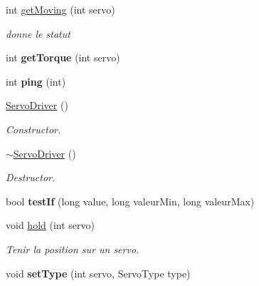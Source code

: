 \begin{DoxyCompactItemize}
int \hyperlink{classServoDriver_a0a8e84f0bbcff39549ddfc239f1a6237}{get\+Moving} (int servo)
\begin{DoxyCompactList}\small\item\em donne le statut \end{DoxyCompactList}\item 
\mbox{\label{classServoDriver_a108cce4f0dcf60bf443ee932621bc89c}} 
int {\bfseries get\+Torque} (int servo)
\item 
\mbox{\label{classServoDriver_afc853f7f2f46acb7e4721f4ce4314522}} 
int {\bfseries ping} (int)
\item 
\mbox{\label{classServoDriver_a2076bae148e26ee3f854f1f1984d9714}} 
\hyperlink{classServoDriver_a2076bae148e26ee3f854f1f1984d9714}{Servo\+Driver} ()
\begin{DoxyCompactList}\small\item\em Constructor. \end{DoxyCompactList}\item 
\mbox{\label{classServoDriver_acf6cad7d5b891fbe4ff44eaec8409db7}} 
\hyperlink{classServoDriver_acf6cad7d5b891fbe4ff44eaec8409db7}{$\sim$\+Servo\+Driver} ()
\begin{DoxyCompactList}\small\item\em Destructor. \end{DoxyCompactList}\item 
\mbox{\label{classServoDriver_a1717fa8a917f761fa8a859636609052c}} 
bool {\bfseries test\+If} (long value, long valeur\+Min, long valeur\+Max)
\item 
\mbox{\label{classServoDriver_af580283b3d1765c9a27276e9a870cf88}} 
void \hyperlink{classServoDriver_af580283b3d1765c9a27276e9a870cf88}{hold} (int servo)
\begin{DoxyCompactList}\small\item\em Tenir la position sur un servo. \end{DoxyCompactList}\item 
\mbox{\label{classServoDriver_abf685dbc27150bf205fd1e4fc8a7ed0d}} 
void {\bfseries set\+Type} (int servo, Servo\+Type type)
\item 

\end{DoxyCompactItemize}
